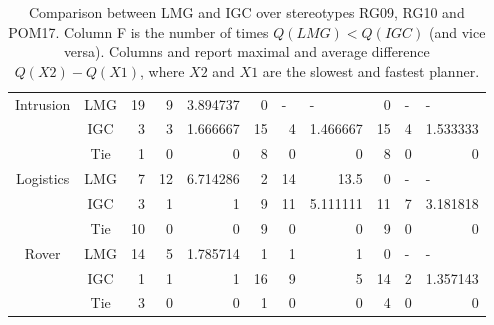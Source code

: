 \documentclass{article}
\begin{document}
\begin{table}[htbp]
\begin{tabular}{|c|c|r|r|r|r|r|r|r|r|r|}
\multirow{3}{*}{Intrusion} & LMG & 19 & 9 & 3.894737 & 0 & \multicolumn{1}{l|}{-} & \multicolumn{1}{l|}{-} & 0 & \multicolumn{1}{l|}{-} & \multicolumn{1}{l|}{-} \\
&IGC & 3 & 3 & 1.666667 & 15 & 4 & 1.466667 & 15 & 4 & 1.533333 \\
&Tie & 1 & 0 & 0 & 8 & 0 & 0 & 8 & 0 & 0 \\ \hline
\multirow{3}{*}{Logistics} & LMG & 7 & 12 & 6.714286 & 2 & 14 & 13.5 & 0 & \multicolumn{1}{l|}{-} & \multicolumn{1}{l|}{-} \\
&IGC & 3 & 1 & 1 & 9 & 11 & 5.111111 & 11 & 7 & 3.181818 \\
&Tie & 10 & 0 & 0 & 9 & 0 & 0 & 9 & 0 & 0 \\ \hline
\multirow{3}{*}{Rover} & LMG & 14 & 5 & 1.785714 & 1 & 1 & 1 & 0 & \multicolumn{1}{l|}{-} & \multicolumn{1}{l|}{-} \\
&IGC & 1 & 1 & 1 & 16 & 9 & 5 & 14 & 2 & 1.357143 \\
&Tie & 3 & 0 & 0 & 1 & 0 & 0 & 4 & 0 & 0 \\ \hline
\end{tabular}
\label{LMG:IGC2}
\caption{Comparison between LMG and IGC over stereotypes
RG09, RG10 and POM17. Column F is the number of times
$Q(LMG) < Q(IGC)$ (and vice versa). Columns and
report maximal and average difference $Q(X2) - Q(X1)$, where
$X2$ and $X1$ are the slowest and fastest planner.}
\end{table}
\end{document}
